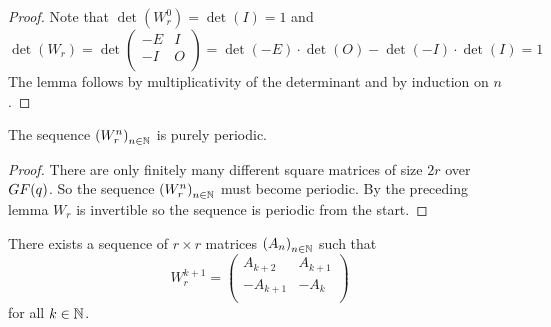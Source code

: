 \begin{proof}
  Note that $\det(W_{r}^{0}) = \det(I) = 1$ and
  \[
  \det(W_{r}) = \det
  \left(
  \begin{array}{cc}
    -E & I \\
    -I & O \\
  \end{array}
  \right)
  =
  \det(-E) \cdot \det(O) - \det(-I) \cdot \det(I)
  =
  1
  \]
  The lemma follows by multiplicativity of the determinant and
  by induction on $n$.
\end{proof}

\begin{theorem}
  The sequence $\left(W_{r}^{n}\right)_{n\in\mathbb{N}}$ is purely periodic.
\end{theorem}

\begin{proof}
  There are only finitely many different square matrices of size $2r$ over
  $GF(q)$. So the sequence $\left(W_{r}^{n}\right)_{n\in\mathbb{N}}$ must
  become periodic. By the preceding lemma $W_{r}$ is invertible so the
  sequence is periodic from the start.
\end{proof}

\begin{lemma}[$W$-structure]
  There exists a sequence of $r \times r$ matrices
  $\left(A_{n}\right)_{n\in\mathbb{N}}$ such that
  \[
  W_{r}^{k+1}
  =
  \left(
  \begin{array}{cc}
     A_{k+2} &  A_{k+1} \\
    -A_{k+1} & -A_{k}   \\
  \end{array}
  \right)
  \]
  for all $k\in\mathbb{N}$.
\end{lemma}

